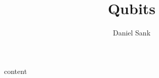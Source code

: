 \documentclass{article}
\author{Daniel Sank}
\title{Qubits}
\begin{document}
\maketitle

{content}



\end{document}
